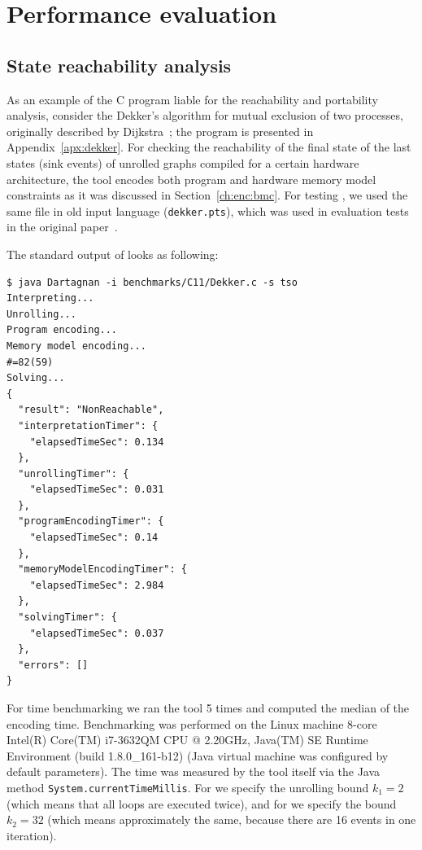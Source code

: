 \section{Performance evaluation}
\label{ch:eval:perf}

\subsection{State reachability analysis}
\label{ch:eval:perf:reach}

As an example of the C program liable for the reachability and portability analysis, consider the Dekker's algorithm for mutual exclusion of two processes, originally described by Dijkstra~\cite{dijkstra1962over}; the program is presented in Appendix~\ref{apx:dekker}.
For checking the reachability of the final state of the last states (sink events) of unrolled graphs compiled for a certain hardware architecture, the tool encodes both program and hardware memory model constraints as it was discussed in Section~\ref{ch:enc:bmc}.
For testing \porthos[1], we used the same file in old \porthos{} input language (\texttt{dekker.pts}), which was used in evaluation tests in the original paper~\cite{Porthos17a}.


The standard output of \porthos[2] looks as following:
\begin{lstlisting}
$ java Dartagnan -i benchmarks/C11/Dekker.c -s tso
Interpreting...
Unrolling...
Program encoding...
Memory model encoding...
#=82(59)
Solving...
{
  "result": "NonReachable",
  "interpretationTimer": {
    "elapsedTimeSec": 0.134
  },
  "unrollingTimer": {
    "elapsedTimeSec": 0.031
  },
  "programEncodingTimer": {
    "elapsedTimeSec": 0.14
  },
  "memoryModelEncodingTimer": {
    "elapsedTimeSec": 2.984
  },
  "solvingTimer": {
    "elapsedTimeSec": 0.037
  },
  "errors": []
}
\end{lstlisting}

For time benchmarking we ran the tool 5 times and computed the median of the encoding time.
Benchmarking was performed on the Linux machine 8-core Intel(R) Core(TM) i7-3632QM CPU @ 2.20GHz, Java(TM) SE Runtime Environment (build 1.8.0\_161-b12) (Java virtual machine was configured by default parameters).
The time was measured by the tool itself via the Java method \texttt{System.currentTimeMillis}.
For \porthos[1] we specify the unrolling bound $k_1 = 2$ (which means that all loops are executed twice), and for \porthos[2] we specify the bound $k_2 = 32$ (which means approximately the same, because there are 16 events in one iteration).

